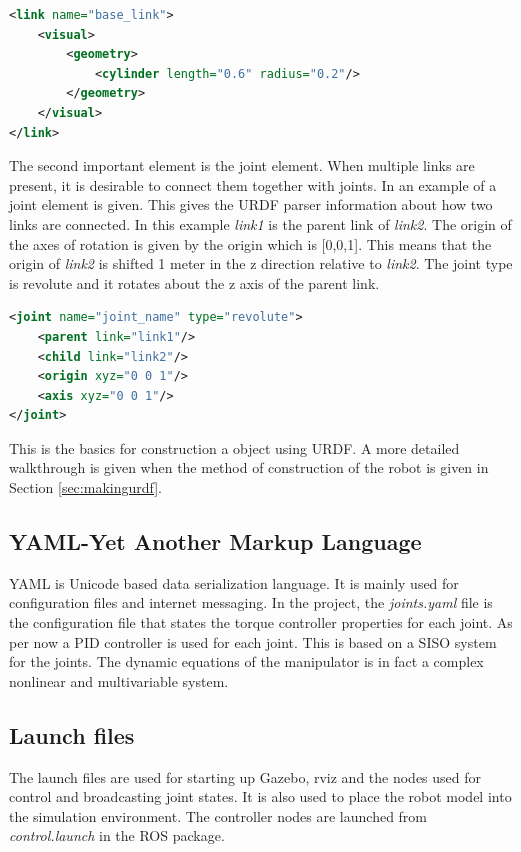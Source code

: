 \begin{lstlisting}[language=xml,caption={URDF code example of a link element},label={lst:example}]
<link name="base_link">
    <visual>
        <geometry>
            <cylinder length="0.6" radius="0.2"/>
        </geometry>
    </visual>
</link>
\end{lstlisting}
The second important element is the joint element. When multiple links are present, it is desirable to connect them together with joints. In  an example of a joint element is given. This gives the URDF parser information about how two links are connected. In this example \textit{link1} is the parent link of \textit{link2}. The origin of the axes of rotation is given by the origin which is [0,0,1]. This means that the origin of \textit{link2} is shifted 1 meter in the z direction relative to \textit{link2}. The joint type is revolute and it rotates about the z axis of the parent link. 

\begin{lstlisting}[language=xml,caption={URDF code example of a joint element},label={lst:jointexample}]
<joint name="joint_name" type="revolute">
    <parent link="link1"/>
    <child link="link2"/>
    <origin xyz="0 0 1"/>
    <axis xyz="0 0 1"/>
</joint>
\end{lstlisting}
This is the basics for construction a object using URDF. A more detailed walkthrough is given when the method of construction of the robot is given in Section \ref{sec:makingurdf}\cite{ROSWiki}.


\subsection{YAML-Yet Another Markup Language}
YAML is Unicode based data serialization language. It is mainly used for configuration files and internet messaging\cite{YAMLdoc}. In the project, the \textit{joints.yaml} file is the configuration file that states the torque controller properties for each joint. As per now a PID controller is used for each joint. This is based on a SISO system for the joints. The dynamic equations of the manipulator is in fact a complex nonlinear and multivariable system\cite{spong}.

\subsection{Launch files}
The launch files are used for starting up Gazebo, rviz and the nodes used for control and broadcasting joint states. It is also used to place the robot model into the simulation environment. The controller nodes are launched from \textit{control.launch} in the ROS package. 



























